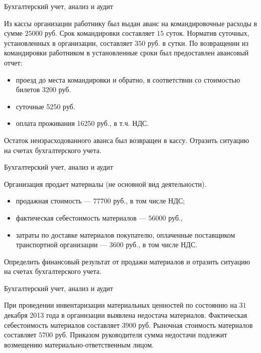 \documentclass[
	11pt,
	a4paper,
	]
	{article}
\begin{document}
 {Бухгалтерский учет, анализ и аудит}

\prGE

	Из кассы организации работнику был выдан аванс на командировочные расходы в сумме $25000$ руб. Срок командировки составляет $15$ суток. Норматив суточных, установленных в организации, составляет $350$ руб. в сутки. По возвращении из командировки работником в установленные сроки был предоставлен авансовый отчет:

	\begin{itemize}
		\item проезд до места командировки и обратно, в соответствии со стоимостью билетов 3200 руб.
		\item суточные 5250 руб.
		\item оплата проживания 16250 руб., в т.ч. НДС.
	\end{itemize}

	Остаток неизрасходованного аванса был возвращен в кассу. Отразить ситуацию на счетах бухгалтерского учета.

\begin{center}\lowGE * \end{center}

\newpage




 {Бухгалтерский учет, анализ и аудит}
\prGE

	Организация продает материалы (не основной вид деятельности). 

	\begin{itemize}
		\item продажная стоимость --- $77 700$ руб., в том числе НДС; 
		\item фактическая себестоимость материалов --- $ 56 000 $ руб., 
		\item затраты по доставке материалов покупателю, оплаченные поставщиком транспортной организации --- $ 3 600 $ руб., в том числе НДС. 
	\end{itemize}

	Определить финансовый результат от продажи материалов и отразить ситуацию на счетах бухгалтерского учета.

\begin{center}\lowGE * \end{center}
\newpage



 {Бухгалтерский учет, анализ и аудит}
\prGE

	При проведении инвентаризации материальных ценностей по состоянию на $ 31 $ декабря 2013 года в организации выявлена недостача материалов. Фактическая себестоимость материалов составляет $ 3 900 $ руб. Рыночная стоимость материалов составляет $ 5700 $ руб. Приказом руководителя сумма недостачи подлежит возмещению материально-ответственным лицом.
	\medskip
\end{document}
